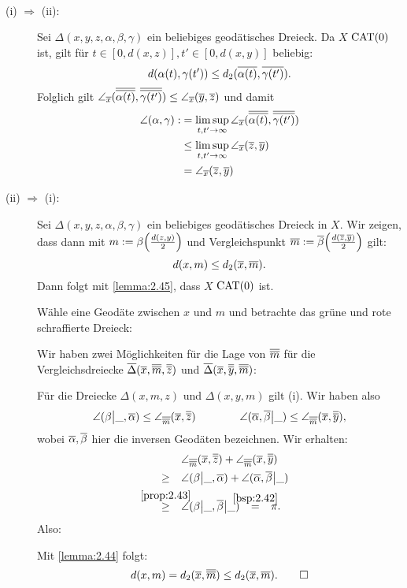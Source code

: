 \begin{beweis}
	\mbox{} \\[-.9cm]
	\begin{description}
		\item[(i) $\Rightarrow$ (ii):] Sei $\Delta(x,y,z,\alpha,\beta,\gamma)$ ein beliebiges geodätisches Dreieck.
		Da $X$ $\operatorname{CAT(0)}$ ist, gilt für $t \in [0,d(x,z)], t' \in [0,d(x,y)]$ beliebig: 
		\[
			d(\alpha(t),\gamma(t')) \leq d_2(\overline{\alpha(t)},\overline{\gamma(t')}).
		\]
		Folglich gilt $\angle_{\overline{x}}(\overline{\overline{\alpha(t)}},\overline{\overline{\gamma(t')}}) \leq \angle_{\overline{x}}(\overline{y},\overline{z})$ und damit
		\begin{align*}
			\angle(\alpha,\gamma) :&= \limsup\limits_{t,t' \rightarrow \infty} \angle_{\overline{x}}(\overline{\overline{\alpha(t)}},\overline{\overline{\gamma(t')}}) \\
			&\leq \limsup\limits_{t,t' \rightarrow \infty} \angle_{\overline{x}}(\overline{z},\overline{y}) \\
			&= \angle_{\overline{x}} (\overline{z},\overline{y})
		\end{align*}
		\item[(ii) $\Rightarrow$ (i):] Sei $\Delta(x,y,z,\alpha,\beta,\gamma)$ ein beliebiges geodätisches Dreieck in $X$.
		Wir zeigen, dass dann mit $m := \beta\enbrace*{\frac{d(z,y)}{2}}$ und Vergleichspunkt $\ol{m} := \ol{\beta}\enbrace*{\frac{d(\ol{z},\ol{y})}{2}}$ gilt:
		\[
			d(x,m) \leq d_2(\overline{x},\overline{m}).
		\]
		Dann folgt mit \autoref{lemma:2.45}, dass $X$ $\operatorname{CAT(0)}$ ist.
		
		Wähle eine Geodäte zwischen $x$ und $m$ und betrachte das grüne und rote schraffierte Dreieck: 
		
		Wir haben zwei Möglichkeiten für die Lage von $\overline{\overline{m}}$ für die Vergleichsdreiecke $\overline{\Delta}(\overline{x},\overline{\overline{m}},\overline{\overline{z}})$ und $\overline{\Delta}(\overline{x},\overline{\overline{y}},\overline{\overline{m}})$: 
		
		Für die Dreiecke $\Delta(x,m,z)$ und $\Delta(x,y,m)$ gilt (i).
		Wir haben also
		\[
			\angle(\beta\big|\_,\overline{\alpha}) \leq \angle_{\overline{\overline{m}}}(\overline{x},\overline{\overline{z}}) \qquad \qquad \angle(\overline{\alpha},\overline{\beta}\big|\_) \leq \angle_{\overline{\overline{m}}}(\overline{x},\overline{\overline{y}}),
		\]
		wobei $\overline{\alpha},\overline{\beta}$ hier die inversen Geodäten bezeichnen.
		Wir erhalten:
		\begin{align*}
			&\angle_{\ol{\ol{m}}}(\ol{x},\ol{\ol{z}}) + \angle_{\ol{\ol{m}}}(\ol{x},\ol{\ol{y}}) \\
			\stack{}{\geq} &\angle(\beta\big|\_,\ol{\alpha}) + \angle(\ol{\alpha},\ol{\beta}\big|\_) \\
			\stack{\ref{prop:2.43}}{\geq} &\angle(\beta\big|\_,\ol{\beta}\big|\_) \stack{\ref{bsp:2.42}}{=} \pi.
		\end{align*}
		Also: 
		
		Mit \autoref{lemma:2.44} folgt:
		\[
			d(x,m) = d_2(\overline{x},\overline{\overline{m}}) \leq d_2(\overline{x},\overline{m}). \qedhere
		\]
	\end{description}
\end{beweis}

